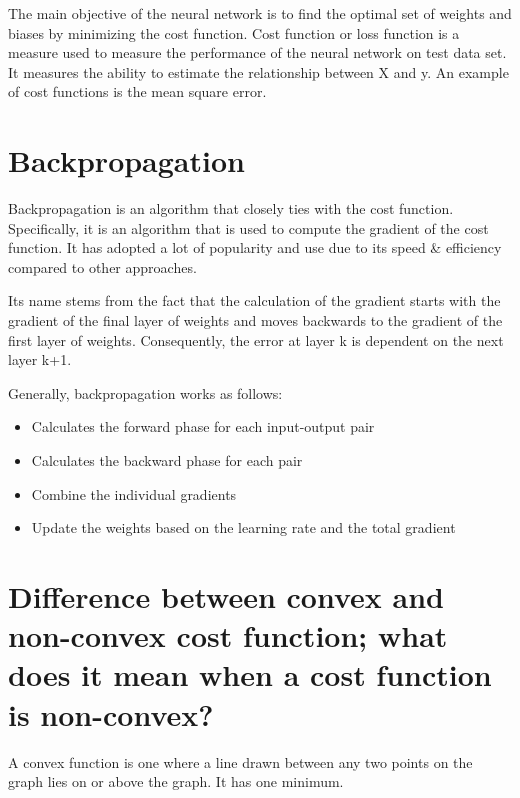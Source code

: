 \documentclass[
]{book}
\providecommand{\tightlist}{%
  \setlength{\itemsep}{0pt}\setlength{\parskip}{0pt}}
\begin{document}
The main objective of the neural network is to find the optimal set of weights and biases by minimizing the cost function. Cost function or loss function is a measure used to measure the performance of the neural network on test data set. It measures the ability to estimate the relationship between X and y. An example of cost functions is the mean square error.

\hypertarget{backpropagation-1}{%
\section{Backpropagation}\label{backpropagation-1}}

Backpropagation is an algorithm that closely ties with the cost function. Specifically, it is an algorithm that is used to compute the gradient of the cost function. It has adopted a lot of popularity and use due to its speed \& efficiency compared to other approaches.

Its name stems from the fact that the calculation of the gradient starts with the gradient of the final layer of weights and moves backwards to the gradient of the first layer of weights. Consequently, the error at layer k is dependent on the next layer k+1.

Generally, backpropagation works as follows:

\begin{itemize}
\tightlist
\item
  Calculates the forward phase for each input-output pair
\item
  Calculates the backward phase for each pair
\item
  Combine the individual gradients
\item
  Update the weights based on the learning rate and the total gradient
\end{itemize}

\hypertarget{difference-between-convex-and-non-convex-cost-function-what-does-it-mean-when-a-cost-function-is-non-convex}{%
\section{Difference between convex and non-convex cost function; what does it mean when a cost function is non-convex?}\label{difference-between-convex-and-non-convex-cost-function-what-does-it-mean-when-a-cost-function-is-non-convex}}

A convex function is one where a line drawn between any two points on the graph lies on or above the graph. It has one minimum.
\end{document}
